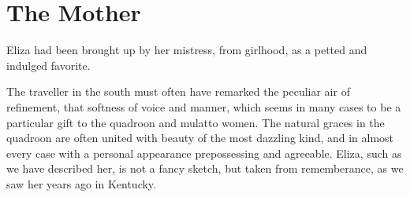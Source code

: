 \chapter{The Mother}

Eliza had been brought up by her mistress, from girlhood, as a petted and
indulged favorite.

The traveller in the south must often have remarked the peculiar air of
refinement, that softness of voice and manner, which seems in many cases to be
a particular gift to the quadroon and mulatto women. The natural graces in the
quadroon are often united with beauty of the most dazzling kind, and in almost
every case with a personal appearance prepossessing and agreeable. Eliza, such
as we have described her, is not a fancy sketch, but taken from rememberance, as
we saw her years ago in Kentucky.
